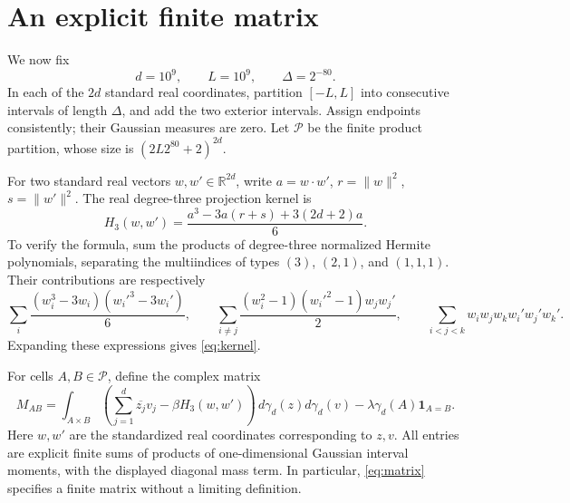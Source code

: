 \documentclass[11pt]{article}
\theoremstyle{remark}\newtheorem{remark}[theorem]{Remark}
\newcommand{\R}{\mathbb R}
\newcommand{\norm}[1]{\lVert #1\rVert}
\newcommand{\ind}{\mathbf 1}
\begin{document}
\section{An explicit finite matrix}

We now fix
\begin{equation}\label{eq:finiteparameters}
 d=10^9,\qquad L=10^9,\qquad \Delta=2^{-80}.
\end{equation}
In each of the \(2d\) standard real coordinates, partition
\([-L,L]\) into consecutive intervals of length \(\Delta\), and
add the two exterior intervals. Assign endpoints consistently; their
Gaussian measures are zero. Let \(\mathcal P\) be the finite product
partition, whose size is \((2L2^{80}+2)^{2d}\).

For two standard real vectors \(w,w'\in\R^{2d}\), write
\(a=w\cdot w'\), \(r=\norm w^2\), \(s=\norm{w'}^2\). The real
degree-three projection kernel is
\begin{equation}\label{eq:kernel}
 H_3(w,w')=\frac{a^3-3a(r+s)+3(2d+2)a}{6}.
\end{equation}
To verify the formula, sum the products of degree-three normalized
Hermite polynomials, separating the multiindices of types \((3)\),
\((2,1)\), and \((1,1,1)\). Their contributions are respectively
\[
 \sum_i\frac{(w_i^3-3w_i)(w_i'^3-3w_i')}{6},\qquad
 \sum_{i\ne j}\frac{(w_i^2-1)(w_i'^2-1)w_jw_j'}2,
 \qquad\sum_{i<j<k}w_iw_jw_kw_i'w_j'w_k'.
\]
Expanding these expressions gives \eqref{eq:kernel}.

For cells \(A,B\in\mathcal P\), define the complex matrix
\begin{equation}\label{eq:matrix}
 M_{AB}=\int_{A\times B}
 \left(\sum_{j=1}^d\overline{z_j}v_j-\beta H_3(w,w')\right)
 \,d\gamma_d(z)d\gamma_d(v)
 -\lambda\gamma_d(A)\ind_{A=B}.
\end{equation}
Here \(w,w'\) are the standardized real coordinates corresponding to
\(z,v\). All entries are explicit finite sums of products of
one-dimensional Gaussian interval moments, with the displayed diagonal
mass term. In particular, \eqref{eq:matrix} specifies a finite matrix
without a limiting definition.
\end{document}
